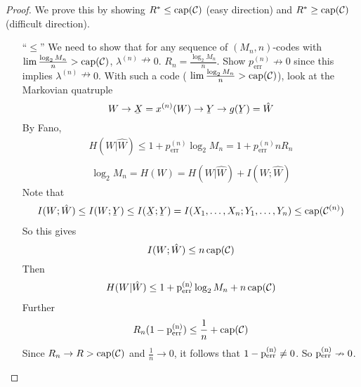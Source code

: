 \documentclass[mfit.tex]{subfiles}
\begin{document}
\begin{proof}
  We prove this by showing $R^\ast \leq \operatorname{cap}(\mathcal{C})$ (easy direction) and $R^\ast \geq \operatorname{cap}(\mathcal{C})$ (difficult direction).
  \begin{enumerate}
    \item[\enquote{$\leq$}] We need to show that for any sequence of $(M_n,n)$-codes with $\lim \frac{\log_2 M_n}{n} > \operatorname{cap}(\mathcal{C})$, $\lambda^{(n)} \nrightarrow 0$. $R_n = \frac{\log_2 M_n}{n}$.
    Show $p_{\text{err}}^{(n)} \nrightarrow 0$ since this implies $\lambda^{(n)} \nrightarrow 0$.
    With such a code ( $\lim \frac{\log_2 M_n}{n} > \operatorname{cap}(\mathcal{C})$), look at the Markovian quatruple 
    \[ W \to \ubar{X} = x^{(n)}(W) \to \ubar{Y} \to g(\ubar{Y}) = \hat{W} \]
    By Fano, 
    \begin{align*}
      H(W|\hat{W}) \leq 1 + p_{\text{err}}^{(n)} \log_2 M_n = 1 + p_{\text{err}}^{(n)} n R_n \\
    \end{align*}
    \begin{align*}
      \log_2 M_n = H(W) = H(W|\hat{W}) + I(W;\hat{W})
    \end{align*}
    Note that
    \begin{align*}
      I(W;\hat{W}) \leq I(W; \ubar{Y}) \leq I(\ubar{X};\ubar{Y}) = I(X_1,\dots,X_n;Y_1,\dots,Y_n) \leq \capa(\mathcal{C}^{(n)})
    \end{align*}
    So this gives
    \[ I(W;\hat{W}) \leq n \operatorname{cap}(\mathcal{C}) \]
    Then
    \begin{align*}
      H(W|\hat{W}) \leq 1 + \operatorname{p_{\text{err}}^{(n)}} \log_2 M_n + n \operatorname{cap}(\mathcal{C})
    \end{align*}
    Further
    \begin{align*}
      R_n ( 1 - \operatorname{p_{\text{err}}^{(n)}}) \leq \frac{1}{n} + \operatorname{cap}(\mathcal{C})
    \end{align*}
    Since $R_n \to R > \operatorname{cap}(\mathcal{C})$ and $\frac{1}{n} \to 0$, it follows that $1 - \operatorname{p_{\text{err}}^{(n)}} \neq 0$.
    So $\operatorname{p_{\text{err}}^{(n)}} \nrightarrow 0$.
  \end{enumerate}
\end{proof}

\end{document}
